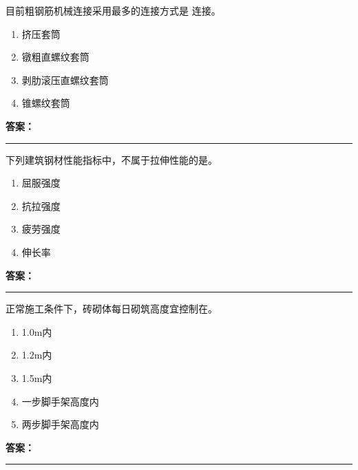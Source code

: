 \documentclass[UTF8,fontset=fandol,11pt]{ctexart}
\newcommand{\answerline}{\textcolor{answerred}{\rule{2.4cm}{0.7pt}}}
\begin{document}
\vspace{0.2em}

\begin{quizbox}[title={乱序第 262 题｜第四章混凝土结构工程}]

目前粗钢筋机械连接采用最多的连接方式是 连接。\\

\begin{enumerate}[label=\Alph*.]

\item 挤压套筒

\item 镦粗直螺纹套筒

\item 剥肋滚压直螺纹套筒

\item 锥螺纹套筒

\end{enumerate}

\textbf{\textcolor{answerred}{答案：}} \answerline

\end{quizbox}

\vspace{0.2em}

\begin{quizbox}[title={乱序第 263 题｜第四章混凝土结构工程}]

下列建筑钢材性能指标中，不属于拉伸性能的是。\\

\begin{enumerate}[label=\Alph*.]

\item 屈服强度

\item 抗拉强度

\item 疲劳强度

\item 伸长率

\end{enumerate}

\textbf{\textcolor{answerred}{答案：}} \answerline

\end{quizbox}

\vspace{0.2em}

\begin{quizbox}[title={乱序第 264 题｜第六章砌筑工程}]

正常施工条件下，砖砌体每日砌筑高度宜控制在。\\

\begin{enumerate}[label=\Alph*.]

\item 1.0m内

\item 1.2m内

\item 1.5m内

\item 一步脚手架高度内

\item 两步脚手架高度内

\end{enumerate}

\textbf{\textcolor{answerred}{答案：}} \answerline

\end{quizbox}

\vspace{0.2em}
\end{document}
